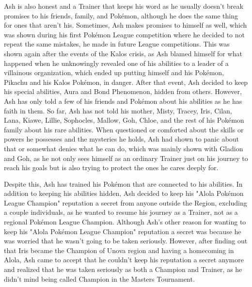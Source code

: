 \documentclass[a4paper,12pt]{article}
\begin{document}
Ash is also honest and a Trainer that keeps his word as he usually doesn't break promises to his friends, family, and Pokémon, although he does the same thing for ones that aren't his. Sometimes, Ash makes promises to himself as well, which was shown during his first Pokémon League competition where he decided to not repeat the same mistakes, he made in future League competitions. This was shown again after the events of the Kalos crisis, as Ash blamed himself for what happened when he unknowingly revealed one of his abilities to a leader of a villainous organization, which ended up putting himself and his Pokémon, Pikachu and his Kalos Pokémon, in danger. After that event, Ash decided to keep his special abilities, Aura and Bond Phenomenon, hidden from others. However, Ash has only told a few of his friends and Pokémon about his abilities as he has faith in them. So far, Ash has not told his mother, Misty, Tracey, Iris, Cilan, Lana, Kiawe, Lillie, Sophocles, Mallow, Goh, Chloe, and the rest of his Pokémon family about his rare abilities. When questioned or comforted about the skills or powers he possesses and the mysteries he holds, Ash had shown to panic about that or somewhat denies what he can do, which was mainly shown with Gladion and Goh, as he not only sees himself as an ordinary Trainer just on his journey to reach his goals but is also trying to protect the ones he cares deeply for.\\ \par \vspace{0.5cm}

Despite this, Ash has trained his Pokémon that are connected to his abilities. In addition to keeping his abilities hidden, Ash decided to keep his "Alola Pokémon League Champion" reputation a secret from anyone outside the Region, excluding a couple individuals, as he wanted to resume his journey as a Trainer, not as a regional Pokémon League Champion. Although Ash's other reason for wanting to keep his "Alola Pokémon League Champion" reputation a secret was because he was worried that he wasn't going to be taken seriously. However, after finding out that Iris became the Champion of Unova region and having a homecoming in Alola, Ash came to accept that he couldn't keep his reputation a secret anymore and realized that he was taken seriously as both a Champion and Trainer, as he didn't mind being called Champion in the Masters Tournament.\\ \par \vspace{0.5cm}
\end{document}
